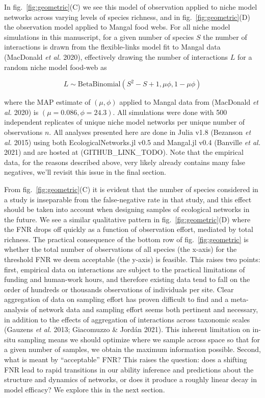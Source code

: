 \documentclass[10pt,oneside]{article}
\begin{document}
In fig.~\ref{fig:geometric}(C) we see this model of observation applied
to niche model networks across varying levels of species richness, and
in fig.~\ref{fig:geometric}(D) the observation model applied to Mangal
food webs. For all niche model simulations in this manuscript, for a
given number of species \(S\) the number of interactions is drawn from
the flexible-links model fit to Mangal data (MacDonald \emph{et al.}
2020), effectively drawing the number of interactions \(L\) for a random
niche model food-web as

\[L \sim  \text{BetaBinomial}(S^2-S+1,\mu\phi, 1-\mu\phi)\]

where the MAP estimate of \((\mu, \phi)\) applied to Mangal data from
(MacDonald \emph{et al.} 2020) is \((\mu=0.086, \phi=24.3)\). All
simulations were done with 500 independent replicates of unique niche
model networks per unique number of observations \(n\). All analyses
presented here are done in Julia v1.8 (Bezanson \emph{et al.} 2015)
using both EcologicalNetworks.jl v0.5 and Mangal.jl v0.4 (Banville
\emph{et al.} 2021) and are hosted at (GITHUB\_LINK\_TODO). Note that
the empirical data, for the reasons described above, very likely already
contains many false negatives, we'll revisit this issue in the final
section.

From fig.~\ref{fig:geometric}(C) it is evident that the number of
species considered in a study is inseparable from the false-negative
rate in that study, and this effect should be taken into account when
designing samples of ecological networks in the future. We see a similar
qualitative pattern in fig.~\ref{fig:geometric}(D) where the FNR drops
off quickly as a function of observation effort, mediated by total
richness. The practical consequence of the bottom row of
fig.~\ref{fig:geometric} is whether the total number of observations of
all species (the x-axis) for the threshold FNR we deem acceptable (the
y-axis) is feasible. This raises two points: first, empirical data on
interactions are subject to the practical limitations of funding and
human-work hours, and therefore existing data tend to fall on the order
of hundreds or thousands observations of individuals per site. Clear
aggregation of data on sampling effort has proven difficult to find and
a meta-analysis of network data and sampling effort seems both pertinent
and necessary, in addition to the effects of aggregation of interactions
across taxonomic scales (Gauzens \emph{et al.} 2013; Giacomuzzo \&
Jordán 2021). This inherent limitation on in-situ sampling means we
should optimize where we sample across space so that for a given number
of samples, we obtain the maximum information possible. Second, what is
meant by ``acceptable'' FNR? This raises the question: does a shifting
FNR lead to rapid transitions in our ability inference and predictions
about the structure and dynamics of networks, or does it produce a
roughly linear decay in model efficacy? We explore this in the next
section.
\end{document}
